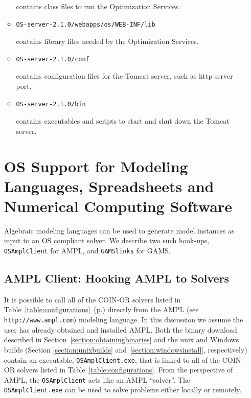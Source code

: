 \documentclass[11pt]{article}
\renewcommand{\_}{{\char"5F}}
\renewcommand{\{}{{\char"7B}}
\renewcommand{\}}{{\char"7D}}
\renewcommand{\^}{{\char"0D}}
\renewcommand{\'}{{\char"0D}}
\begin{document}
\begin{enumerate}[Step 1:]
\begin{itemize}
contains class files to run the Optimization Services.
\item
\begin{verbatim}
OS-server-2.1.0/webapps/os/WEB-INF/lib
\end{verbatim}
contains library files needed by the Optimization Services.
\item
\begin{verbatim}
OS-server-2.1.0/conf
\end{verbatim}
contains configuration files for the Tomcat server, such as http server port.
\item
\begin{verbatim}
OS-server-2.1.0/bin
\end{verbatim}
contains executables and scripts to start and shut down the Tomcat server.
\end{itemize}



\section{OS Support for Modeling Languages, Spreadsheets and Numerical Computing Software}\label{section:modellang}

Algebraic modeling languages can be used to generate model instances as input to an OS compliant solver.
We describe two such hook-ups, {\tt OSAmplClient} for AMPL, and {\tt GAMSlinks} for GAMS.


\subsection{AMPL Client:  Hooking AMPL to Solvers}\label{section:amplclient}





It is possible to call all of the COIN-OR solvers listed in %
Table~\ref{table:configurations}~(p.\pageref{table:configurations})
directly from the  AMPL (see {\tt http://www.ampl.com}) modeling language.  In this discussion we assume 
the user has already obtained and installed AMPL.  
Both the binary download described in Section~\ref{section:obtainingbinaries}
and the unix and Windows builds (Section \ref{section:unixbuilds}
and~\ref{section:windowsinstall}, respectively) contain
an executable, {\tt OSAmplClient.exe},
that is linked to all of the COIN-OR solvers  listed in Table~\ref{table:configurations}. %
From the  perspective of AMPL, the   {\tt OSAmplClient} acts like an AMPL ``solver''.    
The {\tt OSAmplClient.exe}   can be used to solve problems either locally or remotely.   



\end{enumerate}
\end{document}
